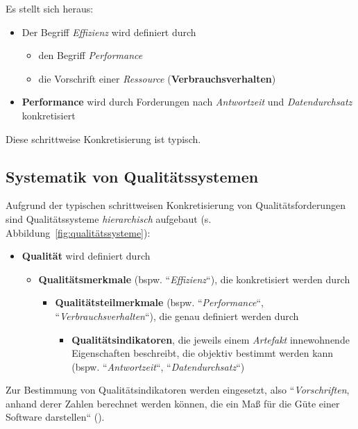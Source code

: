 \noindent
Es stellt sich heraus:

\begin{itemize}
    \item Der Begriff \textit{Effizienz} wird definiert durch
    \begin{itemize}
        \item den Begriff \textit{Performance}
        \item die Vorschrift einer \textit{Ressource} (\textbf{Verbrauchsverhalten})
    \end{itemize}
    \item \textbf{Performance} wird durch Forderungen nach \textit{Antwortzeit} und \textit{Datendurchsatz} konkretisiert
\end{itemize}

\noindent
Diese schrittweise Konkretisierung ist typisch.

\subsection*{Systematik von Qualitätssystemen}
Aufgrund der typischen schrittweisen Konkretisierung von Qualitätsforderungen sind Qualitätssysteme  \textit{hierarchisch} aufgebaut (s. Abbildung~\ref{fig:qualitätssysteme}):

\begin{itemize}
    \item \textbf{Qualität} wird definiert durch
    \begin{itemize}
        \item  \textbf{Qualitätsmerkmale} (bspw. ``\textit{Effizienz}``), die konkretisiert werden durch
        \begin{itemize}
            \item  \textbf{Qualitätsteilmerkmale} (bspw. ``\textit{Performance}``, ``\textit{Verbrauchsverhalten}``), die genau definiert werden durch
             \begin{itemize}
                       \item \textbf{Qualitätsindikatoren}, die jeweils einem \textit{Artefakt} innewohnende Eigenschaften beschreibt, die objektiv bestimmt werden kann (bspw. ``\textit{Antwortzeit}``, ``\textit{Datendurchsatz}``)
            \end{itemize}
        \end{itemize}
    \end{itemize}
\end{itemize}

\noindent
Zur Bestimmung von Qualitätsindikatoren werden  eingesetzt, also ``\textit{Vorschriften}, anhand derer Zahlen berechnet werden können, die ein Maß für die Güte einer Software darstellen`` (\cite[3, Hervorhebung eigene]{Wed09c}).


